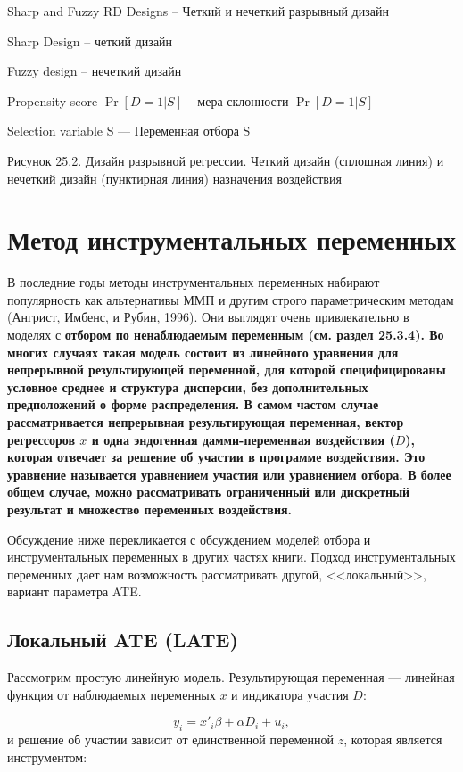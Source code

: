 Sharp and Fuzzy RD Designs -- Четкий и нечеткий разрывный дизайн

Sharp Design -- четкий дизайн

Fuzzy design -- нечеткий дизайн

Propensity score $\Pr[D=1|S]$ -- мера склонности $\Pr[D = 1|S]$

Selection variable S --- Переменная отбора S

Рисунок 25.2. Дизайн разрывной регрессии. Четкий дизайн (сплошная линия) и нечеткий дизайн (пунктирная линия) назначения воздействия 


\section{Метод инструментальных переменных}

В последние годы методы инструментальных переменных набирают популярность как альтернативы ММП и другим строго параметрическим методам (Ангрист, Имбенс, и Рубин, 1996). Они выглядят очень привлекательно в моделях с \bfseries отбором по ненаблюдаемым переменным \mdseries (см. раздел 25.3.4). Во многих случаях такая модель состоит из линейного уравнения для непрерывной результирующей переменной, для которой специфицированы условное среднее и структура дисперсии, без дополнительных предположений о форме распределения. В самом частом случае рассматривается непрерывная результирующая переменная, вектор регрессоров $x$ и одна эндогенная дамми-переменная воздействия ($D$), которая отвечает за решение об участии в программе воздействия. Это уравнение называется уравнением участия или уравнением отбора. В более общем случае, можно рассматривать ограниченный или дискретный результат и множество переменных воздействия. 

Обсуждение ниже перекликается с обсуждением моделей отбора и инструментальных переменных в других частях книги. Подход инструментальных переменных дает нам возможность рассматривать другой, <<локальный>>, вариант параметра ATE. 

\subsection{Локальный ATE (LATE)}

Рассмотрим простую линейную модель. Результирующая переменная --- линейная функция от наблюдаемых переменных $x$ и индикатора участия $D$:

\begin{equation}
\label{eq25.64}
y_i = x'_i \beta + \alpha D_i + u_i,
\end{equation}
и решение об участии зависит от единственной переменной $z$, которая является инструментом:

